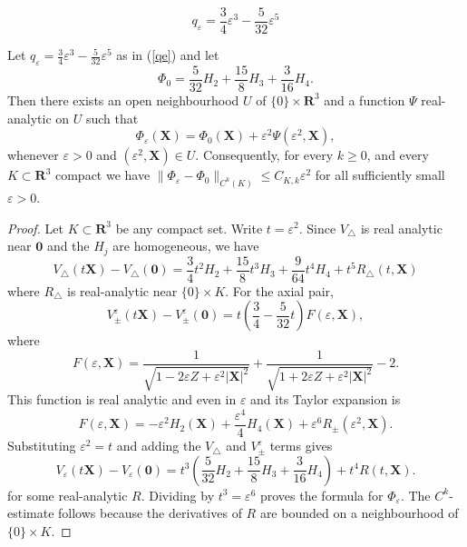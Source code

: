 \documentclass[10pt,a4paper]{amsart}
\newcommand{\R}{\mathbf{R}}
\begin{document}
		\begin{equation}\label{qe}
			q_\varepsilon=\frac{3}{4} \varepsilon^3 - \frac{5}{32} \varepsilon^5
		\end{equation}

	\begin{lem}\label{lem:convergence}
		Let $q_{\varepsilon} = \frac{3}{4} \varepsilon^3 - \frac{5}{32} \varepsilon^5$ as in (\ref{qe}) and let
		\[
		\Phi_0 = \frac{5}{32} H_2+\frac{15}{8}H_3+\frac{3}{16}H_4.
		\]
		Then there exists an open neighbourhood $U$ of $\{ 0 \} \times \R^3$ and a function $\Psi$ real-analytic on $U$ such that
		\[
		\Phi_\varepsilon(\mathbf X) = \Phi_0(\mathbf X)+\varepsilon^2\Psi(\varepsilon^2,\mathbf X),
		\]
		whenever $\varepsilon>0$ and $(\varepsilon^2,\mathbf X)\in U.$ Consequently, for every $k\geq0$, and every $K \subset \R^3$ compact we have $\lVert \Phi_\varepsilon-\Phi_0 \rVert_{C^k(K)} \leq C_{K,k}\varepsilon^2$ for all sufficiently small \(\varepsilon>0\).
	\end{lem}

	\begin{proof}
		Let $K \subset \R^3$ be any compact set. Write $t = \varepsilon^2.$ Since $V_{\triangle}$ is real analytic near $\mathbf{0}$ and the $H_j$ are homogeneous, we have
		\[
		V_{\triangle}(t \mathbf X) - V_{\triangle}(\mathbf 0) = \frac{3}{4} t^2 H_2 + \frac{15} {8} t^3 H_3 + \frac{9}{64} t^4 H_4 + t^5 R_{\triangle} (t,\mathbf X)
		\]
		where $R_{\triangle}$ is real-analytic near $\{ 0 \} \times K.$ For the axial pair, 
		\[
		V^{\varepsilon}_{\pm}(t \mathbf X) - V^{\varepsilon}_{\pm}(\mathbf 0) = t \left(\frac{3}{4}-\frac{5}{32} t \right) F (\varepsilon,\mathbf X),
		\]
		where
		\[
		F(\varepsilon,\mathbf X)
		=
		\frac1{\sqrt{1-2\varepsilon Z+\varepsilon^2|\mathbf X|^2}}
		+
		\frac1{\sqrt{1+2\varepsilon Z+\varepsilon^2|\mathbf X|^2}}
		-2.
		\]
		This function is real analytic and even in $\varepsilon$ and its Taylor expansion is
		\[
		F(\varepsilon,\mathbf X)
		=
		-\varepsilon^2H_2(\mathbf X)
		+\frac{\varepsilon^4}{4}H_4(\mathbf X)
		+\varepsilon^6R_{\pm}(\varepsilon^2,\mathbf X).
		\]
		Substituting $\varepsilon^2=t$ and adding the $V_\triangle$ and $V^{\varepsilon}_{\pm}$ terms gives
		\[
		V_{\varepsilon}(t \mathbf X) - V_{\varepsilon}(\mathbf 0) = t^3 \left( \frac{5}{32} H_2 + \frac{15}{8} H_3 + \frac{3}{16} H_4 \right) + t^4 R (t,\mathbf X).
		\]
		for some real-analytic $R.$ Dividing by $t^3=\varepsilon^6$ proves the formula for $\Phi_{\varepsilon}$. The $C^k$-estimate follows because the derivatives of $R$ are bounded on a neighbourhood of $\{0\}\times K$.
	\end{proof}
\end{document}

